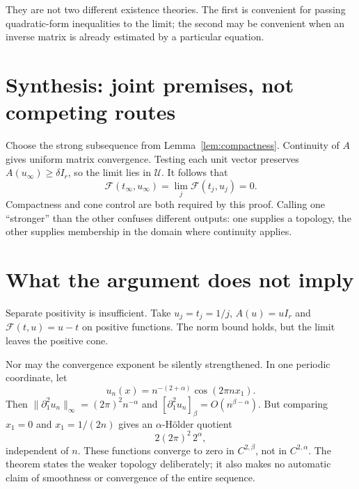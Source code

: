 \documentclass[12pt,reqno]{amsart}
\begin{document}
They are not two different existence theories. The first is convenient for
passing quadratic-form inequalities to the limit; the second may be convenient
when an inverse matrix is already estimated by a particular equation.

\section{Synthesis: joint premises, not competing routes}
Choose the strong subsequence from Lemma~\ref{lem:compactness}. Continuity of
$A$ gives uniform matrix convergence. Testing each unit vector preserves
$A(u_\infty)\geq\delta I_r$, so the limit lies in $\mathcal U$. It follows that
\[
 \mathcal F(t_\infty,u_\infty)=\lim_j\mathcal F(t_j,u_j)=0.
\]
Compactness and cone control are both required by this proof. Calling one
``stronger'' than the other confuses different outputs: one supplies a topology,
the other supplies membership in the domain where continuity applies.

\section{What the argument does not imply}
Separate positivity is insufficient. Take $u_j=t_j=1/j$,
$A(u)=uI_r$ and $\mathcal F(t,u)=u-t$ on positive functions. The norm bound
holds, but the limit leaves the positive cone.

Nor may the convergence exponent be silently strengthened. In one periodic
coordinate, let
\[
 u_n(x)=n^{-(2+\alpha)}\cos(2\pi n x_1).
\]
Then $\|\partial_1^2u_n\|_\infty=(2\pi)^2n^{-\alpha}$ and
$[\partial_1^2u_n]_\beta=O(n^{\beta-\alpha})$. But comparing $x_1=0$
and $x_1=1/(2n)$ gives an $\alpha$-H\"older quotient
\[
 2(2\pi)^2\,2^\alpha,
\]
independent of $n$. These functions converge to zero in $C^{2,\beta}$,
not in $C^{2,\alpha}$. The theorem states the weaker topology deliberately;
it also makes no automatic claim of smoothness or convergence of the entire sequence.

\nocite{S-guide}


\end{document}
